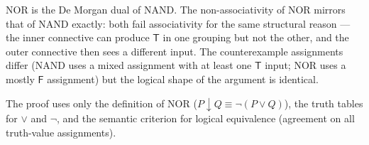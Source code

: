 \begin{remark*}
NOR is the De Morgan dual of NAND. The non-associativity of NOR mirrors that of NAND
exactly: both fail associativity for the same structural reason — the inner
connective can produce $\mathsf{T}$ in one grouping but not the other, and the outer
connective then sees a different input. The counterexample assignments differ
(NAND uses a mixed assignment with at least one $\mathsf{T}$ input; NOR uses a mostly
$\mathsf{F}$ assignment) but the logical shape of the argument is identical.
\end{remark*}

\begin{remark*}[Dependencies]
The proof uses only the definition of NOR ($P \downarrow Q \equiv \neg(P \vee Q)$),
the truth tables for $\vee$ and $\neg$, and the semantic criterion for logical
equivalence (agreement on all truth-value assignments).
\end{remark*}
